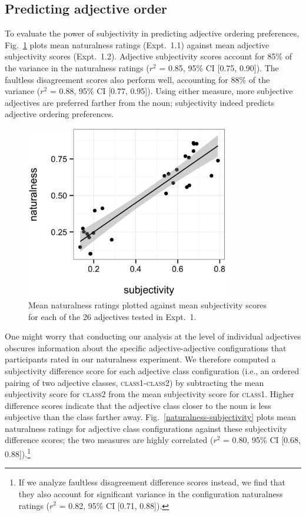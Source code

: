 \documentclass[12pt]{article}
\begin{document}
\subsection{Predicting adjective order}

To evaluate the power of subjectivity in predicting adjective ordering preferences, Fig.~\ref{naturalness-subjectivity-pred} plots mean naturalness ratings (Expt.~1.1) against mean adjective subjectivity scores (Expt.~1.2). Adjective subjectivity scores account for  85\% of the variance in the naturalness ratings ($r^2$ = 0.85, 95\% CI [0.75, 0.90]).
The faultless disagreement scores also perform well, accounting for 88\% of the variance ($r^2$ = 0.88, 95\% CI [0.77, 0.95]).  
Using either measure, more subjective adjectives are preferred farther from the noun; subjectivity indeed predicts adjective ordering preferences.

\begin{figure}
	\centering\includegraphics[width=3.5in]{plots/naturalness-subjectivity-new.eps}
	\caption{Mean naturalness ratings plotted against mean subjectivity scores for each of the 26 adjectives tested in Expt.~1.}\label{naturalness-subjectivity-pred}
\end{figure}

One might worry that conducting our analysis at the level of individual adjectives obscures information about the specific adjective-adjective configurations that participants rated in our naturalness experiment.
We therefore computed a subjectivity difference score for each adjective class configuration (i.e., an ordered pairing of two adjective classes, \textsc{class1}-\textsc{class2}) by subtracting the mean subjectivity score for \textsc{class2} from the mean subjectivity score for \textsc{class1}. Higher difference scores indicate that the adjective class closer to the noun is less subjective than the class farther away. Fig.~\ref{naturalness-subjectivity} plots mean naturalness ratings for adjective class configurations against these subjectivity difference scores; the two measures are highly correlated ($r^2$ = 0.80, 95\% CI [0.68, 0.88]).\footnote{If we analyze faultless disagreement difference scores instead, we find that they also account for significant variance in the configuration naturalness ratings ($r^2$ = 0.82, 95\% CI [0.71, 0.88]).}
\end{document}
